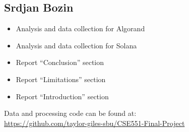 \documentclass{article}
\begin{document}
\subsection{Srdjan Bozin}
\begin{itemize}
    \item Analysis and data collection for Algorand
    \item Analysis and data collection for Solana
    \item Report ``Conclusion'' section
    \item Report ``Limitations'' section
    \item Report ``Introduction'' section
\end{itemize}

\pagebreak

\printbibliography

\noindent
Data and processing code can be found at: \\ \url{https://github.com/taylor-giles-sbu/CSE551-Final-Project}
\end{document}
